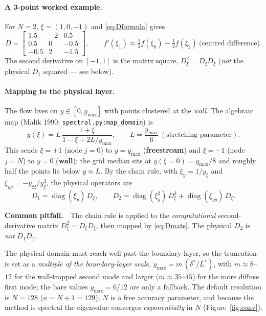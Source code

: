 \documentclass[11pt]{article}
\newcommand{\remark}[2]{%
  \par\smallskip\noindent\colorbox{rmkbg}{%
  \parbox{0.965\linewidth}{\smallskip\footnotesize\textbf{#1}\ \ #2\smallskip}}\par\smallskip}
\begin{document}
\paragraph{A 3-point worked example.} For $N=2$, $\xi=(1,0,-1)$ and \eqref{eq:Dformula} gives
\begin{equation}
  D=\begin{bmatrix}1.5&-2&0.5\\0.5&0&-0.5\\-0.5&2&-1.5\end{bmatrix},\qquad
  f'(\xi_1)\approx\tfrac12f(\xi_0)-\tfrac12f(\xi_2)\ \text{(centred difference).}
\end{equation}
The second derivative on $[-1,1]$ is the matrix square, $D^2_\xi=D_\xi D_\xi$ (\emph{not} the physical
$D_1$ squared --- see below).

\paragraph{Mapping to the physical layer.} The flow lives on $y\in[0,y_{\max}]$ with points clustered at the
\emph{wall}. The algebraic map (Malik 1990; \texttt{spectral.py:map\_domain}) is
\begin{equation}\label{eq:map}
  y(\xi)=L\,\frac{1+\xi}{1-\xi+2L/y_{\max}},\qquad L=\frac{y_{\max}}{6}\ (\text{stretching parameter}).
\end{equation}
This sends $\xi=+1$ (node $j{=}0$) to $y=y_{\max}$ (\textbf{freestream}) and $\xi=-1$ (node $j{=}N$) to
$y=0$ (\textbf{wall}); the grid median sits at $y(\xi{=}0)=y_{\max}/8$ and roughly half the points lie below
$y\approx L$. By the chain rule, with $\xi_y=1/y_\xi$ and $\xi_{yy}=-y_{\xi\xi}/y_\xi^3$, the physical
operators are
\begin{equation}\label{eq:Dmats}
  D_1=\operatorname{diag}(\xi_y)\,D_\xi,\qquad
  D_2=\operatorname{diag}(\xi_y^2)\,D_\xi^2+\operatorname{diag}(\xi_{yy})\,D_\xi .
\end{equation}
\remark{Common pitfall.}{The chain rule is applied to the \emph{computational} second-derivative matrix
$D_\xi^2=D_\xi D_\xi$, then mapped by \eqref{eq:Dmats}. The physical $D_2$ is \emph{not} $D_1D_1$.}

The physical domain must reach well past the boundary layer, so the truncation is set as a \emph{multiple of
the boundary-layer scale}, $y_{\max}=m\,(\delta^*/L^*)$, with $m\approx8$--$12$ for the wall-trapped second
mode and larger ($m\approx35$--$45$) for the more diffuse first mode; the bare values $y_{\max}=6$/$12$ are
only a fallback. The default resolution is $N=128$ ($n{=}N{+}1{=}129$); $N$ is a free accuracy parameter, and
because the method is spectral the eigenvalue converges \emph{exponentially} in $N$ (Figure~\ref{fig:conv}).
\end{document}
